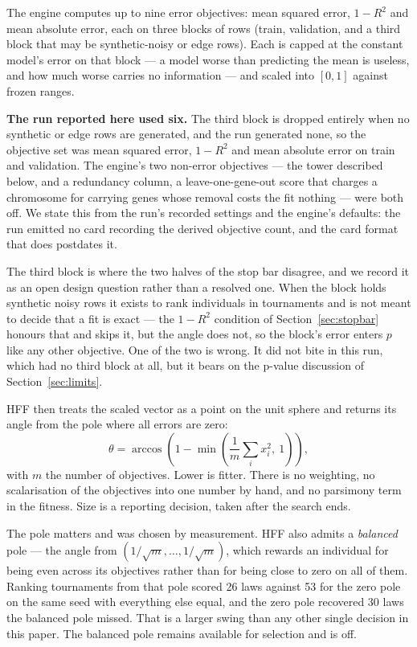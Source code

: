 \documentclass[11pt,a4paper]{article}
\begin{document}
The engine computes up to nine error objectives: mean squared error, $1 - R^2$
and mean absolute error, each on three blocks of rows (train, validation, and a
third block that may be synthetic-noisy or edge rows). Each is capped at the
constant model's error on that block --- a model worse than predicting the mean
is useless, and how much worse carries no information --- and scaled into
$[0,1]$ against frozen ranges.

\textbf{The run reported here used six.} The third block is dropped entirely when
no synthetic or edge rows are generated, and the run generated none, so the
objective set was mean squared error, $1 - R^2$ and mean absolute error on train
and validation. The engine's two non-error objectives --- the tower described
below, and a redundancy column, a leave-one-gene-out score that charges a
chromosome for carrying genes whose removal costs the fit nothing --- were both
off. We state this from the run's recorded
settings and the engine's defaults: the run emitted no card recording the
derived objective count, and the card format that does postdates it.

The third block is where the two halves of the stop bar disagree, and we record
it as an open design question rather than a resolved one. When the block holds
synthetic noisy rows it exists to rank individuals in tournaments and is not
meant to decide that a fit is exact --- the $1 - R^2$ condition of
Section~\ref{sec:stopbar} honours that and skips it, but the angle does not, so
the block's error enters $p$ like any other objective. One of the two is wrong.
It did not bite in this run, which had no third block at all, but it bears on
the p-value discussion of Section~\ref{sec:limits}.

HFF then treats the scaled vector as a point on the unit sphere and returns its
angle from the pole where all errors are zero:
\[
\theta = \arccos\!\left(1 - \min\!\left(\frac{1}{m}\sum_i x_i^2,\ 1\right)\right),
\]
with $m$ the number of objectives. Lower is fitter. There is no weighting, no
scalarisation of the objectives into one number by hand, and no parsimony term
in the fitness. Size is a reporting decision, taken after the search ends.

The pole matters and was chosen by measurement. HFF also admits a
\emph{balanced} pole --- the angle from $(1/\sqrt m, \ldots, 1/\sqrt m)$, which
rewards an individual for being even across its objectives rather than for being
close to zero on all of them. Ranking tournaments from that pole scored 26 laws
against 53 for the zero pole on the same seed with everything else equal, and
the zero pole recovered 30 laws the balanced pole missed. That is a larger swing
than any other single decision in this paper. The balanced pole remains
available for selection and is off.
\end{document}

